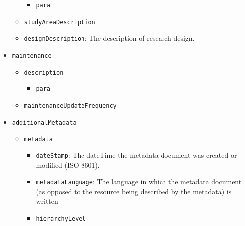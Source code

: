 \documentclass[
  letterpaper,
  DIV=11,
  numbers=noendperiod,
  oneside]{scrreprt}
\providecommand{\tightlist}{%
  \setlength{\itemsep}{0pt}\setlength{\parskip}{0pt}}\usepackage{longtable,booktabs,array}
\begin{document}
\begin{itemize}
\begin{itemize}
    \begin{itemize}
    \tightlist
    \item
      \texttt{para}
    \end{itemize}
  \item
    \texttt{studyAreaDescription}
  \item
    \texttt{designDescription}: The description of research design.
  \end{itemize}
\item
  \texttt{maintenance}

  \begin{itemize}
  \tightlist
  \item
    \texttt{description}

    \begin{itemize}
    \tightlist
    \item
      \texttt{para}
    \end{itemize}
  \item
    \texttt{maintenanceUpdateFrequency}
  \end{itemize}
\item
  \texttt{additionalMetadata}

  \begin{itemize}
  \tightlist
  \item
    \texttt{metadata}

    \begin{itemize}
    \tightlist
    \item
      \texttt{dateStamp}: The dateTime the metadata document was created
      or modified (ISO 8601).
    \item
      \texttt{metadataLanguage}: The language in which the metadata
      document (as opposed to the resource being described by the
      metadata) is written
    \item
      \texttt{hierarchyLevel}


\end{itemize}
\end{itemize}
\end{itemize}
\end{document}
